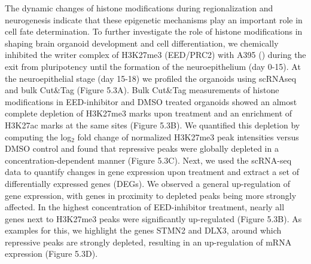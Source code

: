 The dynamic changes of histone modifications during regionalization and neurogenesis indicate that these epigenetic mechanisms play an important role in cell fate determination. To further investigate the role of histone modifications in shaping brain organoid development and cell differentiation, we chemically inhibited the writer complex of H3K27me3 (EED/PRC2) with A395 (\cite{he_eed_2017}) during the exit from pluripotency until the formation of the neuroepithelium (day 0-15). At the neuroepithelial stage (day 15-18) we profiled the organoids using scRNAseq and bulk Cut\&Tag (Figure 5.3A). Bulk Cut\&Tag measurements of histone modifications in EED-inhibitor and DMSO treated organoids showed an almost complete depletion of H3K27me3 marks upon treatment and an enrichment of H3K27ac marks at the same sites (Figure 5.3B). We quantified this depletion by computing the log$_2$ fold change of normalized H3K27me3 peak intensities versus DMSO control and found that repressive peaks were globally depleted in a concentration-dependent manner (Figure 5.3C). Next, we used the scRNA-seq data to quantify changes in gene expression upon treatment and extract a set of differentially expressed genes (DEGs). We observed a general up-regulation of gene expression, with genes in proximity to depleted peaks being more strongly affected. In the highest concentration of EED-inhibitor treatment, nearly all genes next to H3K27me3 peaks were significantly up-regulated (Figure 5.3B). As examples for this, we highlight the genes STMN2 and DLX3, around which repressive peaks are strongly depleted, resulting in an up-regulation of mRNA expression (Figure 5.3D).

